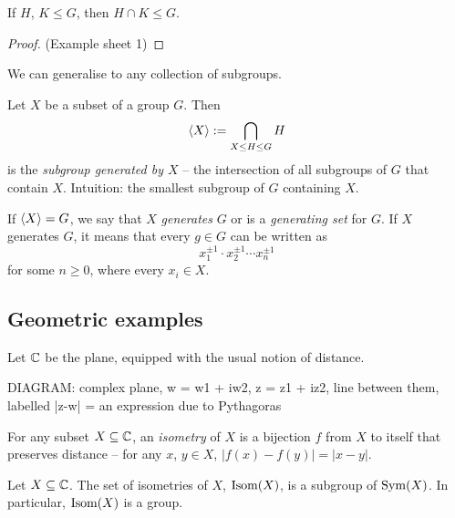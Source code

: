 \documentclass{../template/note}
\begin{document}

    \begin{proposition}
        If \(H\), \(K \leq G\), then \(H \cap K \leq G\).
    \end{proposition}
    
    \begin{proof}
        (Example sheet 1)
    \end{proof}
    
    \begin{remark*}
        We can generalise to any collection of subgroups.
    \end{remark*}
    
    \begin{definition}
        Let \(X\) be a subset of a group \(G\). Then
        \[
            \left \langle X \right \rangle := \bigcap_{X \leq H \leq G} H
        \]
        is the \emph{subgroup generated by \(X\)} -- the intersection of all subgroups of \(G\) that contain \(X\). Intuition: the smallest subgroup of \(G\) containing \(X\).
    \end{definition}
    
    \begin{definition}
        If \(\left \langle X \right \rangle = G\), we say that \(X\) \emph{generates} \(G\) or is a \emph{generating set} for \(G\). If \(X\) generates \(G\), it means that every \(g \in G\) can be written as
        \[
            x_1^{\pm 1} \cdot x_2^{\pm 1} \cdots x_n^{\pm 1}
        \]
        for some \(n \geq 0\), where every \(x_i \in X\).
    \end{definition}
    
    \subsection{Geometric examples}

    Let \(\mathbb C\) be the plane, equipped with the usual notion of distance. 

    DIAGRAM: complex plane, w = w1 + iw2, z = z1 + iz2, line between them, labelled |z-w| = an expression due to Pythagoras

    \begin{definition}
        For any subset \(X \subseteq \mathbb C\), an \emph{isometry} of \(X\) is a bijection \(f\) from \(X\) to itself that preserves distance -- for any \(x\), \(y \in X\), \(|f(x)-f(y)|=|x-y|\).
    \end{definition}
    
    \begin{proposition}
        Let \(X \subseteq \mathbb C\). The set of isometries of \(X\), \(\operatorname{Isom}(X)\), is a subgroup of \(\operatorname{Sym}(X)\). In particular, \(\operatorname{Isom}(X)\) is a group.
    \end{proposition}
    
\end{document}
